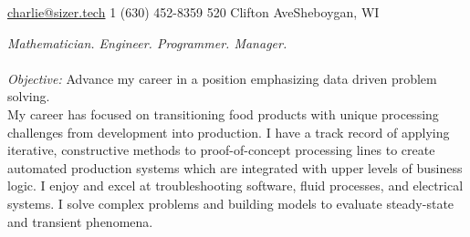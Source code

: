 \documentclass[10pt,a4paper]{article} %
\begin{document}
 



\noindent\href{mailto:charlie@sizer.tech}{charlie@sizer.tech}\bull %
\textsmaller{+}1 (630) 452-8359\bull %
520 Clifton Ave\bull Sheboygan, WI%

\spacedhrule{0.9em}{-0.4em} %



\vspace{-1.3em} %

\begin{multicols}{2}  %
\noindent \textit{Mathematician. Engineer. Programmer. Manager.}\\\\
\emph{Objective: }Advance my career in a position emphasizing  data driven problem solving. \\

My career has focused on transitioning food products with unique processing challenges from development into production. 
I have a track record of applying iterative, constructive methods to proof-of-concept processing lines to create automated production systems which are integrated with upper levels of business logic. 
I enjoy and excel at troubleshooting software, fluid processes, and electrical systems.
I solve complex problems  and building models to evaluate steady-state and transient phenomena.

\end{multicols}

\spacedhrule{0.5em}{-0.4em} %
\end{document}
